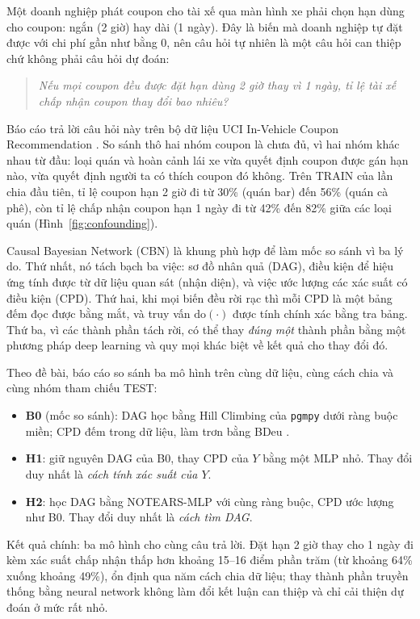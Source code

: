 \documentclass[pdflatex,sn-mathphys-num]{sn-jnl}%
\newcommand{\doop}{\mathrm{do}}                   %
\begin{document}
Một doanh nghiệp phát coupon cho tài xế qua màn hình xe phải chọn hạn dùng cho coupon: ngắn (2 giờ) hay dài (1 ngày). Đây là biến mà doanh nghiệp tự đặt được với chi phí gần như bằng 0, nên câu hỏi tự nhiên là một câu hỏi can thiệp chứ không phải câu hỏi dự đoán:

\begin{quote}
\emph{Nếu mọi coupon đều được đặt hạn dùng 2 giờ thay vì 1 ngày, tỉ lệ tài xế chấp nhận coupon thay đổi bao nhiêu?}
\end{quote}

Báo cáo trả lời câu hỏi này trên bộ dữ liệu UCI In-Vehicle Coupon Recommendation \cite{uci603,wang2017}. So sánh thô hai nhóm coupon là chưa đủ, vì hai nhóm khác nhau từ đầu: loại quán và hoàn cảnh lái xe vừa quyết định coupon được gán hạn nào, vừa quyết định người ta có thích coupon đó không. Trên TRAIN của lần chia đầu tiên, tỉ lệ coupon hạn 2 giờ đi từ 30\% (quán bar) đến 56\% (quán cà phê), còn tỉ lệ chấp nhận coupon hạn 1 ngày đi từ 42\% đến 82\% giữa các loại quán (Hình~\ref{fig:confounding}).

Causal Bayesian Network (CBN) \cite{pearl2009,koller2009} là khung phù hợp để làm mốc so sánh vì ba lý do. Thứ nhất, nó tách bạch ba việc: sơ đồ nhân quả (DAG), điều kiện để hiệu ứng tính được từ dữ liệu quan sát (nhận diện), và việc ước lượng các xác suất có điều kiện (CPD). Thứ hai, khi mọi biến đều rời rạc thì mỗi CPD là một bảng đếm đọc được bằng mắt, và truy vấn $\doop(\cdot)$ được tính chính xác bằng tra bảng. Thứ ba, vì các thành phần tách rời, có thể thay \emph{đúng một} thành phần bằng một phương pháp deep learning và quy mọi khác biệt về kết quả cho thay đổi đó.

Theo đề bài, báo cáo so sánh ba mô hình trên cùng dữ liệu, cùng cách chia và cùng nhóm tham chiếu TEST:
\begin{itemize}
\item \textbf{B0} (mốc so sánh): DAG học bằng Hill Climbing của \texttt{pgmpy} \cite{pgmpy2024} dưới ràng buộc miền; CPD đếm trong dữ liệu, làm trơn bằng BDeu \cite{heckerman1995}.
\item \textbf{H1}: giữ nguyên DAG của B0, thay CPD của $Y$ bằng một MLP nhỏ. Thay đổi duy nhất là \emph{cách tính xác suất của $Y$}.
\item \textbf{H2}: học DAG bằng NOTEARS-MLP \cite{zheng2018,zheng2020} với cùng ràng buộc, CPD ước lượng như B0. Thay đổi duy nhất là \emph{cách tìm DAG}.
\end{itemize}

Kết quả chính: ba mô hình cho cùng câu trả lời. Đặt hạn 2 giờ thay cho 1 ngày đi kèm xác suất chấp nhận thấp hơn khoảng 15--16 điểm phần trăm (từ khoảng 64\% xuống khoảng 49\%), ổn định qua năm cách chia dữ liệu; thay thành phần truyền thống bằng neural network không làm đổi kết luận can thiệp và chỉ cải thiện dự đoán ở mức rất nhỏ.
\end{document}
